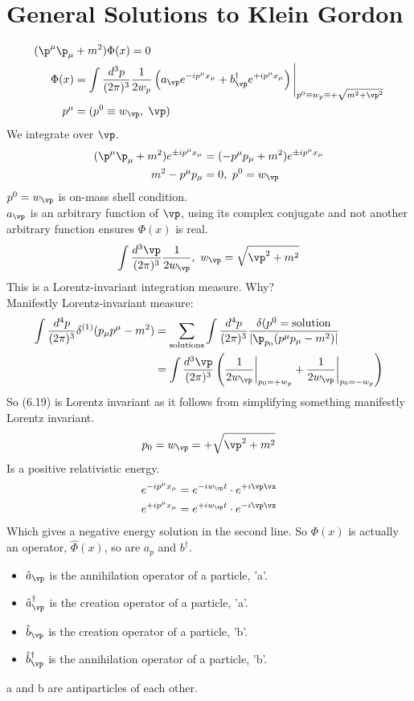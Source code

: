 \documentclass[a4paper, 11pt, normalem]{report}
\begin{document}
\section{General Solutions to Klein Gordon}
\begin{align}
    (\p^\mu\p_\mu &+ m^2)\Phi(x) = 0 \\
    \Phi(x) &= \int \frac{d^3p}{(2\pi)^3} \frac{1}{2w_p}\left(a_{\vp} e^{-ip^\mu x_\mu} + b^{\dagger}_{\vp} e^{+ip^\mu x_\mu}\right)\Bigg|_{p^0\equiv w_p\equiv +\sqrt{m^2+\vp^2}} \\
    p^\mu &= (p^0\equiv w_{\vp},\; \vp)
\end{align}
We integrate over $\vp$.
\begin{align}
    (\p^\mu\p_\mu + m^2)e^{\pm ip^\mu x_\mu} &= (-p^\mu p_\mu + m^2)e^{\pm ip^\mu x_\mu} \\
    m^2 - p^\mu p_\mu &= 0,~ p^0 = w_{\vp}
\end{align}
$p^0 = w_{\vp}$ is on-mass shell condition.\\
$a_{\vp}$ is an arbitrary function of $\vp$, using its complex conjugate and not another arbitrary function ensures $\Phi(x)$ is real.
\begin{align}
    \int \frac{d^3\vp}{(2\pi)^3} \frac{1}{2w_{\vp}},~ w_{\vp} = \sqrt{\vp^2 + m^2}
\end{align}
This is a Lorentz-invariant integration measure. Why? \\
Manifestly Lorentz-invariant measure:
\begin{align}
    \int \frac{d^4p}{(2\pi)^3} \delta^{(1)}(p_\mu p^\mu - m^2) &= \sum_{\text{solutions}} \int \frac{d^4p}{(2\pi)^3} \frac{\delta(p^0=\text{solution}}{|\p_{p_0} (p^\mu p_\mu - m^2)|} \\
                                                               &= \int \frac{d^3\vp}{(2\pi)^3} \left(\frac{1}{2w_{\vp}}\bigg|_{p_0 = +w_p} + \frac{1}{2w_{\vp}}\bigg|_{p_0=-w_p}\right)
\end{align}
So (6.19) is Lorentz invariant as it follows from simplifying something manifestly Lorentz invariant.
\begin{equation}
    p_0 = w_{\vp} = +\sqrt{\vp^2 + m^2} 
\end{equation}
Is a positive relativistic energy. 
\begin{align}
    e^{-ip^\mu x_\mu} &= e^{-iw_{\vp}t}\cdot e^{+i\vp\vx} \\
    e^{+ip^\mu x_\mu} &= e^{+iw_{\vp}t}\cdot e^{-i\vp\vx} \\
\end{align}
Which gives a negative energy solution in the second line.
So $\Phi(x)$ is actually an operator, $\hat{\Phi}(x)$, so are $a_p$ and $b^\dagger$.
\begin{itemize}
    \item $\hat{a}_{\vp}$ is the annihilation operator of a particle, 'a'.
    \item $\hat{a}^{\dagger}_{\vp}$ is the creation operator of a particle, 'a'.
    \item $\hat{b}_{\vp}$ is the creation operator of a particle, 'b'.
    \item $\hat{b}^{\dagger}_{\vp}$ is the annihilation operator of a particle, 'b'.
\end{itemize}
a and b are antiparticles of each other.
\end{document}
